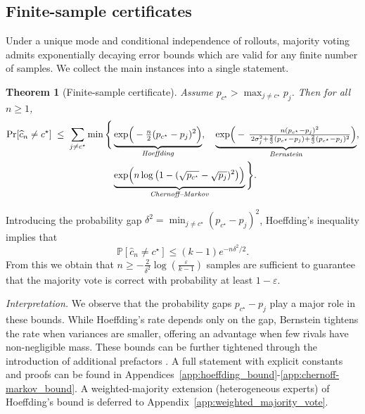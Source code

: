 \documentclass{article} %
\newtheorem{theorem}{Theorem}[section]
\begin{document}
\subsection{Finite-sample certificates}
\label{subsec:finite_sample}

Under a unique mode and conditional independence of rollouts, majority voting admits exponentially decaying error bounds which are valid for any finite number of samples. We collect the main instances into a single statement.

\begin{theorem}[Finite-sample certificate]\label{thm:finite_sample_unified}
Assume $p_{c^\star}>\max_{j\neq c^\star}p_j$. Then for all $n\ge 1$,
\begin{align*}
\Pr[\widehat{c}_n\neq c^\star]
\;\le\;
\sum_{j\neq c^\star}
\min\Bigg\{
&\underbrace{\exp\!\Big(-\tfrac{n}{2}(p_{c^\star}-p_j)^2\Big)}_{\text{\emph{Hoeffding}}},\quad
\underbrace{\exp\!\Big(-\,\tfrac{n (p_{c^\star}-p_j)^2}{\,2\sigma_j^2+\frac{2}{3}(p_{c^\star}-p_j)+\frac{2}{3}(p_{c^\star}-p_j)^2}\Big)}_{\text{\emph{Bernstein}}},\\
&\underbrace{\exp\!\Big(n\log\big(1-(\sqrt{p_{c^\star}}-\sqrt{p_j})^2\big)\Big)}_{\text{\emph{Chernoff--Markov}}}
\Bigg\}.
\end{align*}
\end{theorem}

Introducing the probability gap $\delta^2 = \min_{j \neq c^\star}(p_{c^\star} - p_j)^2$, Hoeffding's inequality implies that
\small
$$
\mathbb{P}[\widehat{c}_n \neq c^\star] \leq (k-1)e^{-n\delta^2/2}.
$$
\normalsize
From this we obtain that
$
n \geq -\tfrac{2}{\delta^2}\log\left(\tfrac{\varepsilon}{k-1}\right)
$
samples are sufficient to guarantee that the majority vote is correct with probability at least $1-\varepsilon$.

\noindent
\textit{Interpretation.} We observe that the probability gaps $p_{c^\star} - p_j$ play a major role in these bounds. 
While Hoeffding's rate depends only on the gap,  Bernstein tightens the rate when variances are smaller, offering an advantage when few rivals have non-negligible mass.  
These bounds can be further tightened through the introduction of additional prefactors \citep{bahadur-rao}. A full statement with explicit constants and proofs can be found in Appendices~\ref{app:hoeffding_bound}-\ref{app:chernoff-markov_bound}.   A weighted-majority extension (heterogeneous experts) of Hoeffding's bound is deferred to Appendix~\ref{app:weighted_majority_vote}.
\end{document}
